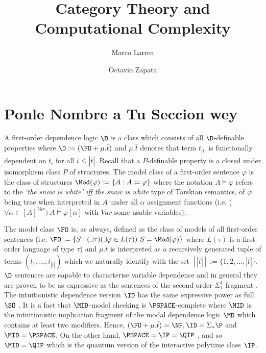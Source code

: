 


\title{Category Theory and \\ Computational Complexity}
\author{Marco Larrea \and Octavio Zapata}


\maketitle

\section{Ponle Nombre a Tu Seccion wey}
A first-order dependence logic $\D$ is a class which consists of all $\D$-definable properties where $\D := (\FO + \mu.\bar{t})$ and $\mu.\bar{t}$ denotes that term $t_{|\bar{t}|}$ is functionally dependent on $t_{i}$ for all $i\leq |\bar{t}|$. Recall that a $P$-definable property is a closed under isomorphism class $P$ of structures. The model class of a first-order sentence $\varphi$ is the class of structures $\Mod(\varphi):=\{A:A\models\varphi\}$ where the notation $A\models\varphi$ refers to the \emph{`the snow is white' iff the snow is white} type of Tarskian semantics, of $\varphi$ being true when interpreted in $A$ under all $\alpha$ assignment functions (i.e. ($\forall\alpha\in [A]^{Var})\ A\models\varphi[\alpha]$ with $Var$ some usable variables). 

The model class $\FO$ is, as always, defined as the class of models of all first-order sentences (i.e. $\FO:= \{S:(\exists\tau)(\exists\varphi\in L(\tau))\ S=\Mod(\varphi)\}$ where $L(\tau)$ is a first-order language of type $\tau$) and $\mu.\bar{t}$ is interpreted as a recursively generated tuple of terms $(t_1,\dots,t_{|\bar{t}|})$ which we naturally identify with the set $[|\bar{t}|] := \{1,2,\dots,|\bar{t}|\}$. $\D$ sentences are capable to characterise variable dependence and in general they are proven to be as expressive as the sentences of the second order $\Sigma_1^1$ fragment \cite{dep}. The intuitionistic dependence version $\ID$ has the same expressive power as full $\SO$ \cite{dep}. It is a fact that $\MID$-model checking is $\PSPACE$-complete \cite{dep} where $\MID$ is the intuitionistic implication fragment of the modal dependence logic $\MD$ which contains at least two modifiers. Hence, $(\FO + \mu.\bar{t}) = \NP, \ID = \Sigma_{\ast}\P$ and $\MID = \PSPACE$.  On the other hand, $\PSPACE = \IP = \QIP$ \cite{qip}, and so $\MID = \QIP$ which is the quantum version of the interactive polytime class $\IP$.

